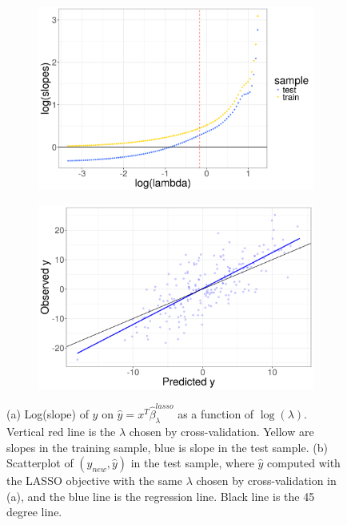 \documentclass[main]{subfiles}
\begin{document}

\begin{figure}[!h]
	\centering
	\begin{subfigure}[t]{0.45\textwidth}
		\includegraphics[width = \textwidth]{./lasso_figures/slope_vs_lambda.png}
	\end{subfigure}
  \begin{subfigure}[t]{0.45\textwidth}
    \includegraphics[width = \textwidth]{./lasso_figures/obs_y_vs_pred2.png}
  \end{subfigure}
  \caption{(a) Log(slope) of $y$ on $\hat y = x^T\hat\beta^{lasso}_\lambda$ as a function of $\log(\lambda)$.
	Vertical red line is the $\lambda$
  chosen by cross-validation. Yellow are slopes in the training sample, blue is slope in the test sample.
  (b) Scatterplot of $(y_{new}, \hat y)$ in the test sample, where
	$\hat y$ computed with the LASSO objective with the same $\lambda$ chosen by cross-validation in (a), and
	the blue line is the regression line.
	Black line is the 45 degree line. }
	\label{fig:lasso_results_fixed}
\end{figure}
\end{document}

